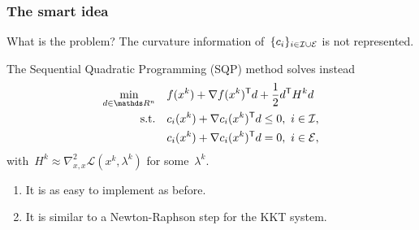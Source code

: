 \documentclass{polyu-presentation}
\newcommand{\con}[1]{c_{#1}}
\newcommand{\ieq}{\mathcal{E}}
\newcommand{\iub}{\mathcal{I}}
\newcommand{\lag}{\mathcal{L}}
\newcommand{\obj}{f}
\begin{document}
\begin{frame}
    \frametitle{The smart idea}

    \begin{block}{What is the problem?}
        The \alert{curvature information} of~$\set{\con{i}}_{i \in \iub \cup \ieq}$ is not represented.
    \end{block}

    \medskip

    The \alert{Sequential Quadratic Programming} (SQP) method solves instead
    \begin{align*}
        \min_{d \in \R^n}   & \quad \obj(x^k) + \nabla \obj(x^k)^{\T} d + \frac{1}{2} d^{\T} H^k d\\
        \text{s.t.}         & \quad \con{i}(x^k) + \nabla \con{i}(x^k)^{\T} d \le 0, ~ i \in \iub,\\
                            & \quad \con{i}(x^k) + \nabla \con{i}(x^k)^{\T} d = 0, ~ i \in \ieq,
    \end{align*}
    with~$H^k \approx \nabla_{x, x}^2 \lag(x^k, \lambda^k)$ for some~$\lambda^k$.

    \medskip

    \begin{block}{}
        \begin{enumerate}
            \item It is as easy to \alert{implement} as before.
            \item It is similar to a \alert{Newton-Raphson} step for the \alert{KKT system}.
        \end{enumerate}
    \end{block}
\end{frame}
\end{document}
